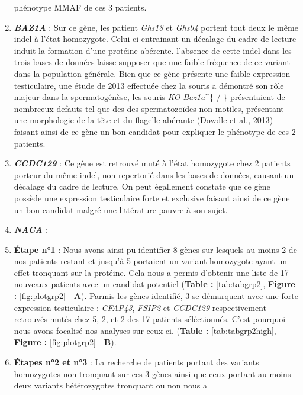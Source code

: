 \documentclass[12pt,twoside]{reedthesis}
\theoremstyle{definition}
\theoremstyle{definition}
\theoremstyle{remark}
\begin{document}
\begin{enumerate}
    phénotype MMAF de ces 3 patients.
  \item
    \textbf{\emph{BAZ1A}} : Sur ce gène, les patient \emph{Ghs18} et
    \emph{Ghs94} portent tout deux le même indel à l'état homozygote.
    Celui-ci entrainant un décalage du cadre de lecture induit la
    formation d'une protéine abérente. l'absence de cette indel dans les
    trois bases de données laisse supposer que une faible fréquence de ce
    variant dans la population générale. Bien que ce gène présente une
    faible expression testiculaire, une étude de 2013 effectuée chez la
    souris a démontré son rôle majeur dans la spermatogénèse, les souris
    \emph{KO} \emph{Baz1a}\^{}\{-/-\} présentaient de nombreeux defauts
    tel que des des spermatozoïdes non motiles, présentant une morphologie
    de la tête et du flagelle abérante (Dowdle et al.,
    \protect\hyperlink{ref-Dowdle2013}{2013}) faisant ainsi de ce gène un
    bon candidat pour expliquer le phénotype de ces 2 patients.
  \item
    \textbf{\emph{CCDC129}} : Ce gène est retrouvé muté à l'état
    homozygote chez 2 patients porteur du même indel, non repertorié dans
    les bases de données, causant un décalage du cadre de lecture. On peut
    égallement constate que ce gène possède une expression testiculaire
    forte et exclusive faisant ainsi de ce gène un bon candidat malgré une
    littérature pauvre à son sujet.
  \item
    \textbf{\emph{NACA}} :
  \item
    \textbf{Étape n°1} : Nous avons ainsi pu identifier 8 gènes sur
    lesquels au moins 2 de nos patients restant et jusqu'à 5 portaient un
    variant homozygote ayant un effet tronquant sur la protéine. Cela nous
    a permis d'obtenir une liste de 17 nouveaux patients avec un candidat
    potentiel (\textbf{Table :} \ref{tab:tabgrp2}, \textbf{Figure :}
    \ref{fig:plotgrp2} - \textbf{A}). Parmis les gènes identifié, 3 se
    démarquent avec une forte expression testiculaire : \emph{CFAP43},
    \emph{FSIP2} et \emph{CCDC129} respectivement retrouvés mutés chez 5,
    2, et 2 des 17 patients séléctionnés. C'est pourquoi nous avons
    focalisé nos analyses sur ceux-ci. (\textbf{Table :
    }\ref{tab:tabgrp2high}, \textbf{Figure :} \ref{fig:plotgrp2} -
    \textbf{B}).
  \item
    \textbf{Étapes n°2 et n°3} : La recherche de patients portant des
    variants homozygotes non tronquant sur ces 3 gènes ainsi que ceux
    portant au moins deux variants hétérozygotes tronquant ou non nous a

\end{enumerate}
\end{document}
